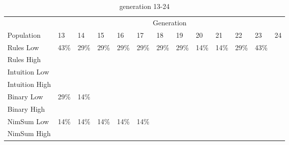 \begin{table}
	\medskip
	\begin{subtable}{\linewidth}
	\centering
	\caption{generation 13-24}
		\begin{tabular}{l|llllllllllll}\hline
		\multicolumn{1}{l}{} & \multicolumn{12}{c}{Generation} \\
		\multicolumn{1}{l}{Population} & 13 & 14 & 15 & 16 & 17 & 18 & 19 & 20 & 21 & 22 & 23 & 24\\\hline
		Rules Low & 43\% & 29\% & 29\% & 29\% & 29\% & 29\% & 29\% & 14\% & 14\% & 29\% & 43\% & \textemdash \\
		Rules High & \textemdash & \textemdash & \textemdash & \textemdash & \textemdash & \textemdash & \textemdash & \textemdash & \textemdash & \textemdash & \textemdash & \textemdash \\
		Intuition Low & \textemdash & \textemdash & \textemdash & \textemdash & \textemdash & \textemdash & \textemdash & \textemdash & \textemdash & \textemdash & \textemdash & \textemdash \\
		Intuition High & \textemdash & \textemdash & \textemdash & \textemdash & \textemdash & \textemdash & \textemdash & \textemdash & \textemdash & \textemdash & \textemdash & \textemdash \\
		Binary Low & 29\% & 14\% & \textemdash & \textemdash & \textemdash & \textemdash & \textemdash & \textemdash & \textemdash & \textemdash & \textemdash & \textemdash \\
		Binary High & \textemdash & \textemdash & \textemdash & \textemdash & \textemdash & \textemdash & \textemdash & \textemdash & \textemdash & \textemdash & \textemdash & \textemdash \\
		NimSum Low & 14\% & 14\% & 14\% & 14\% & 14\% & \textemdash & \textemdash & \textemdash & \textemdash & \textemdash & \textemdash & \textemdash \\
		NimSum High & \textemdash & \textemdash & \textemdash & \textemdash & \textemdash & \textemdash & \textemdash & \textemdash & \textemdash & \textemdash & \textemdash & \textemdash \\
		\end{tabular}
	\end{subtable}
\end{table}

